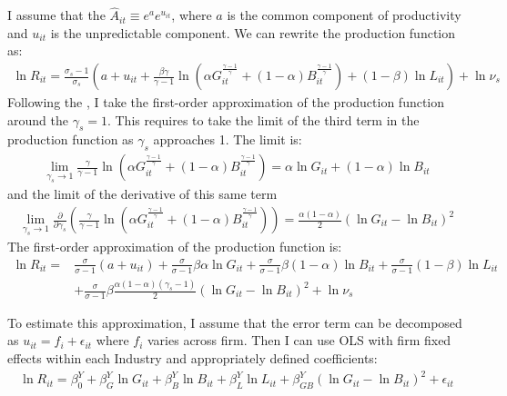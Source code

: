 I assume that the $\hat{A}_{it} \equiv e^a e^{u_{it}}$, where $a$ is the common component of productivity and $u_{it}$ is the unpredictable component. We can rewrite the production function as:
\begin{gather*}
    \ln R_{it} = \frac{\sigma_s - 1}{\sigma_s}(a + u_{it} + \frac{\beta\gamma}{\gamma-1} \ln(
        \alpha G_{it}^{\frac{\gamma-1}{\gamma}} + (1-\alpha) B_{it}^{\frac{\gamma-1}{\gamma}}
    ) + (1-\beta) \ln L_{it}) + \ln \nu_{s}
\end{gather*}
Following the \cite{kmenta1967estimation}, I take the first-order approximation of the production function around the $\gamma_s = 1$. This requires to take the limit of the third term in the production function as $\gamma_s$ approaches 1. The limit is:
\begin{gather*}
    \lim_{\gamma_s \to 1} \frac{\gamma}{\gamma-1} \ln(
        \alpha G_{it}^{\frac{\gamma-1}{\gamma}} + (1-\alpha) B_{it}^{\frac{\gamma-1}{\gamma}}
    ) = \alpha \ln G_{it}   + (1-\alpha)\ln B_{it}
\end{gather*}
and the limit of the derivative of this same term
\begin{gather*}
    \lim_{\gamma_s \to 1} \frac{\partial}{\partial \gamma_s} \left( \frac{\gamma}{\gamma-1} \ln(
        \alpha G_{it}^{\frac{\gamma-1}{\gamma}} + (1-\alpha) B_{it}^{\frac{\gamma-1}{\gamma}}
    ) \right) =  \frac{\alpha (1-\alpha)}{2}(\ln G_{it} - \ln B_{it})^2
\end{gather*}
The first-order approximation of the production function is:
\begin{equation*}
     \begin{split}
        \ln R_{it} =  & \frac{\sigma}{\sigma-1}(a + u_{it}) +  \frac{\sigma}{\sigma-1}\beta\alpha \ln G_{it}   + \frac{\sigma}{\sigma-1}\beta(1-\alpha)\ln B_{it} + \frac{\sigma}{\sigma-1}(1-\beta) \ln L_{it} \\
         & + \frac{\sigma}{\sigma-1}\beta \frac{\alpha (1-\alpha)(\gamma_s - 1)}{2}(\ln G_{it} - \ln B_{it})^2 + \ln \nu_{s}
    \end{split}
\end{equation*}

To estimate this approximation, I assume that the error term can be decomposed as $u_{it} = f_i + \epsilon_{it}$ where $f_i$ varies across firm. Then I can use OLS with firm fixed effects  within each Industry and appropriately defined coefficients:
\begin{gather*}
    \ln R_{it} = \beta_0^Y + \beta_G^Y \ln G_{it} + \beta_B^Y \ln B_{it} + \beta_L^Y \ln L_{it} + \beta_{GB}^Y (\ln G_{it} - \ln B_{it})^2 + \epsilon_{it}
\end{gather*}

